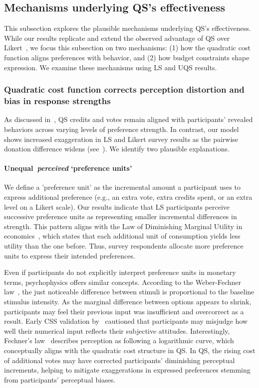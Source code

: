 \subsection{Mechanisms underlying QS's effectiveness}
This subsection explores the plausible mechanisms underlying QS's effectiveness. While our results replicate and extend the observed advantage of QS over Likert~\cite{chengCanShowWhat2021}, we focus this subsection on two mechanisms: (1) how the quadratic cost function aligns preferences with behavior, and (2) how budget constraints shape expression. We examine these mechanisms using LS and UQS results.

\subsubsection{Quadratic cost function corrects perception distortion and bias in response strengths}
As discussed in~, QS credits and votes remain aligned with participants' revealed behaviors across varying levels of preference strength. In contrast, our model shows increased exaggeration in LS and Likert survey results as the pairwise donation difference widens (see~). We identify two plausible explanations.

\paragraph{Unequal~\textit{perceived} `preference units'}
We define a 'preference unit' as the incremental amount a participant uses to express additional preference (e.g., an extra vote, extra credits spent, or an extra level on a Likert scale). Our results indicate that LS participants perceive successive preference units as representing smaller incremental differences in strength. This pattern aligns with the Law of Diminishing Marginal Utility in economics~\cite{gossen1983laws, kahnemanProspectTheoryAnalysis1979}, which states that each additional unit of consumption yields less utility than the one before. Thus, survey respondents allocate more preference units to express their intended preferences.

Even if participants do not explicitly interpret preference units in monetary terms, psychophysics offers similar concepts. According to the Weber-Fechner law~\cite{dehaeneNeuralBasisWeber2003, kruegerReconcilingFechnerStevens1989}, the just noticeable difference between stimuli is proportional to the baseline stimulus intensity. As the marginal difference between options appears to shrink, participants may feel their previous input was insufficient and overcorrect as a result. Early CSS validation by~\citet{dudekValidityPointAssignmentProcedure1957} cautioned that participants may misjudge how well their numerical input reflects their subjective attitudes. Interestingly, Fechner's law~\cite{kruegerReconcilingFechnerStevens1989} describes perception as following a logarithmic curve, which conceptually aligns with the quadratic cost structure in QS. In QS, the rising cost of additional votes may have corrected participants' diminishing perceptual increments, helping to mitigate exaggerations in expressed preferences stemming from participants' perceptual biases.

